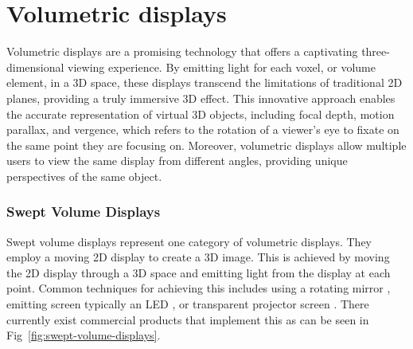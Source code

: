 \section{Volumetric displays}

Volumetric displays \cite{1492264} are a promising technology that offers a captivating three-dimensional viewing experience. By emitting light for each voxel, or volume element, in a 3D space, these displays transcend the limitations of traditional 2D planes, providing a truly immersive 3D effect. This innovative approach enables the accurate representation of virtual 3D objects, including focal depth, motion parallax, and vergence, which refers to the rotation of a viewer's eye to fixate on the same point they are focusing on. Moreover, volumetric displays allow multiple users to view the same display from different angles, providing unique perspectives of the same object.

\subsubsection{Swept Volume Displays}
Swept volume displays represent one category of volumetric displays. They employ a moving 2D display to create a 3D image. This is achieved by moving the 2D display through a 3D space and emitting light from the display at each point. Common techniques for achieving this includes using a rotating mirror \cite{10.1117/12.480930}, emitting screen typically an LED \cite{Gately:11}, or transparent projector screen \cite{keane_volumetric_2016}. There currently exist commercial products that implement this as can be seen in Fig~\ref{fig:swept-volume-displays}.


